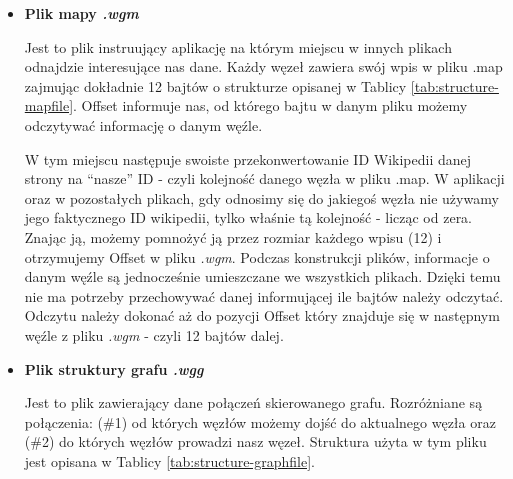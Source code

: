 \begin{itemize}
    \item
\textbf{Plik mapy \textit{.wgm}}\newline

Jest to plik instruujący aplikację na którym miejscu w innych plikach odnajdzie interesujące nas dane.
Każdy węzeł zawiera swój wpis w pliku .map zajmując dokładnie 12 bajtów o strukturze opisanej w Tablicy \ref{tab:structure-mapfile}. Offset informuje nas, od którego bajtu w danym pliku możemy odczytywać informację o danym węźle.


W tym miejscu następuje swoiste przekonwertowanie ID Wikipedii danej strony na “nasze” ID - czyli kolejność danego węzła w pliku .map. W aplikacji oraz w pozostałych plikach, gdy odnosimy się do jakiegoś węzła nie używamy jego faktycznego ID wikipedii, tylko właśnie tą kolejność - licząc od zera. Znając ją, możemy pomnożyć ją przez rozmiar każdego wpisu (12) i otrzymujemy Offset w pliku \textit{.wgm}. Podczas konstrukcji plików, informacje o danym węźle są jednocześnie umieszczane we wszystkich plikach. Dzięki temu nie ma potrzeby przechowywać danej informującej ile bajtów należy odczytać. Odczytu należy dokonać aż do pozycji Offset który znajduje się w następnym węźle z pliku \textit{.wgm} - czyli 12 bajtów dalej.

\item
\textbf{Plik struktury grafu \textit{.wgg}}

Jest to plik zawierający dane połączeń skierowanego grafu. Rozróżniane są połączenia: (\#1) od których węzłów możemy dojść do aktualnego węzła oraz (\#2) do których węzłów prowadzi nasz węzeł. Struktura użyta w tym pliku jest opisana w Tablicy \ref{tab:structure-graphfile}.



\end{itemize}
